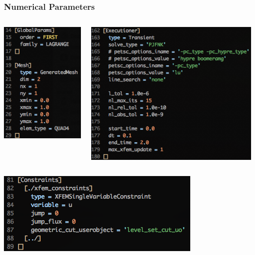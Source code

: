 \documentclass[]{beamer}
\begin{document}
\begin{frame}\frametitle{Numerical Parameters}
  	\begin{columns}
			\begin{center}
			\includegraphics[scale=0.4]{figures/2D_xy_h1m/Screen-GlobalParams-2Dxyh1m}
			\end{center}
			\begin{center}
			\includegraphics[scale=0.4]{figures/2D_xy_h1m/Screen-Executioner-2Dxyh1m}
			\end{center}
	\end{columns}
	\begin{center}
	\includegraphics[scale=0.4]{figures/2D_xy_h1m/Screen-Constraints-2Dxyh1m}
	\end{center}
\end{frame}
\end{document}
